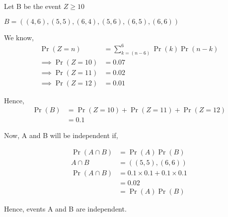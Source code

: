 \documentclass[]{article}
\begin{document}
Let B be the event $Z \geq 10$

$B = ((4,6), (5,5), (6,4), (5,6), (6,5), (6,6))$

We know,
\begin{align}
\Pr(Z=n) &= \sum_{k=(n-6)}^6\Pr(k)\Pr(n-k)\\
\implies \Pr(Z=10) &= 0.07\\
\implies \Pr(Z=11) &= 0.02\\
\implies \Pr(Z=12) &= 0.01
\end{align}

Hence,
\begin{align}
\Pr(B) &= \Pr(Z=10) + \Pr(Z=11) + \Pr(Z=12)\\
&= 0.1
\end{align}

Now, A and B will be independent if,

\begin{align}
\Pr(A \cap B) &= \Pr(A)\Pr(B)\\
A \cap B &= ((5,5), (6,6)) \\
\Pr(A \cap B) &= 0.1 \times 0.1 + 0.1 \times 0.1\\
&= 0.02\\
&= \Pr(A)\Pr(B)
\end{align}

Hence, events A and B are independent.
\end{document}
